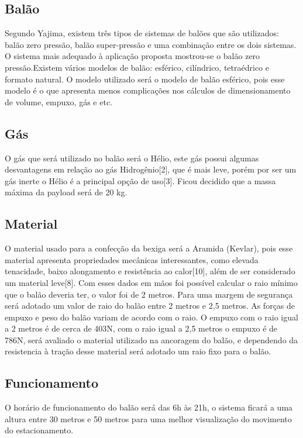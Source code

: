 \subsection{Balão}
    Segundo Yajima, existem três tipos de sistemas de balões que são utilizados: balão zero pressão, balão super-pressão e uma combinação entre os dois sistemas. O sistema mais adequado à aplicação proposta mostrou-se o balão zero pressão.Existem vários modelos de balão: esférico, cilíndrico, tetraédrico e formato natural. O modelo utilizado será o modelo de balão esférico, pois esse modelo é o que apresenta menos complicações nos cálculos de dimensionamento de volume, empuxo, gás e etc.

  \subsection{Gás}
    O gás que será utilizado no balão será o Hélio, este gás possui algumas desvantagens em relação ao gás Hidrogênio[2], que é mais leve, porém por ser um gás inerte o Hélio é a principal opção  de uso[3]. Ficou decidido que a massa  máxima  da payload será de 20 kg.

  \subsection{Material}
    O material usado para a confecção da bexiga será a Aramida (Kevlar), pois  esse material apresenta propriedades mecânicas interessantes, como elevada tenacidade, baixo alongamento e resistência ao calor[10],  além de ser considerado um material leve[8]. Com esses dados em mãos foi possível calcular o raio mínimo que o balão deveria ter, o valor foi de 2 metros. Para uma margem de segurança será adotado um valor de raio do balão entre 2 metros e 2,5 metros. As forças de empuxo e peso do balão variam de acordo com o raio. O empuxo com o raio igual a 2 metros é de cerca de 403N, com o raio igual a 2,5 metros o empuxo é de 786N, será avaliado o material utilizado na ancoragem do balão,  e dependendo da resistencia à tração desse material será adotado um raio fixo para o balão.

\subsection{Funcionamento}
    O horário de funcionamento do balão será das 6h às 21h, o sistema ficará a uma altura entre 30 metros e 50 metros para uma melhor visualização do movimento do estacionamento.

